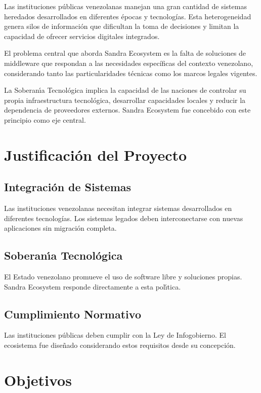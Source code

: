 Las instituciones p\'ublicas venezolanas manejan una gran cantidad de sistemas heredados desarrollados en diferentes \'epocas y tecnolog\'ias. Esta heterogeneidad genera silos de informaci\'on que dificultan la toma de decisiones y limitan la capacidad de ofrecer servicios digitales integrados.

El problema central que aborda Sandra Ecosystem es la falta de soluciones de middleware que respondan a las necesidades espec\'ificas del contexto venezolano, considerando tanto las particularidades t\'ecnicas como los marcos legales vigentes.

La Soberan\'{\i}a Tecnol\'ogica implica la capacidad de las naciones de controlar su propia infraestructura tecnol\'ogica, desarrollar capacidades locales y reducir la dependencia de proveedores externos. Sandra Ecosystem fue concebido con este principio como eje central.

\section{Justificaci\'on del Proyecto}

\subsection{Integraci\'on de Sistemas}
Las instituciones venezolanas necesitan integrar sistemas desarrollados en diferentes tecnolog\'ias. Los sistemas legados deben interconectarse con nuevas aplicaciones sin migraci\'on completa.

\subsection{Soberan\'{\i}a Tecnol\'ogica}
El Estado venezolano promueve el uso de software libre y soluciones propias. Sandra Ecosystem responde directamente a esta pol\'{\i}tica.

\subsection{Cumplimiento Normativo}
Las instituciones p\'ublicas deben cumplir con la Ley de Infogobierno. El ecosistema fue dise\~nado considerando estos requisitos desde su concepci\'on.

\section{Objetivos}

